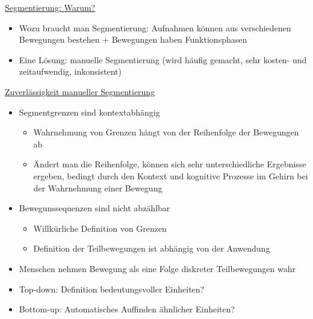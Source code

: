 \documentclass[a4paper,10pt,oneside]{article}
\begin{document}
\underline{Segmentierung: Warum?} \\
	\begin{itemize}
		\item Wozu braucht man Segmentierung: Aufnahmen können aus verschiedenen Bewegungen bestehen + Bewegungen haben Funktionsphasen
		\item Eine Lösung: manuelle Segmentierung (wird häufig gemacht, sehr kosten- und zeitaufwendig, inkonsistent)
	\end{itemize}
	
\underline{Zuverlässigkeit manueller Segmentierung} \\
	\begin{itemize}
		\item Segmentgrenzen sind kontextabhängig
			\begin{itemize}
				\item Wahrnehmung von Grenzen hängt von der Reihenfolge der Bewegungen ab
				\item Ändert man die Reihenfolge, können sich sehr unterschiedliche Ergebnisse ergeben, bedingt durch den Kontext und kognitive Prozesse im Gehirn bei der Wahrnehmung einer Bewegung
			\end{itemize}
		\item Bewegunssequenzen sind nicht abzählbar
			\begin{itemize}
				\item Willkürliche Definition von Grenzen
				\item Definition der Teilbewegungen ist abhängig von der Anwendung
			\end{itemize}
		\item Menschen nehmen Bewegung als eine Folge diskreter Teilbewegungen wahr
		\item Top-down: Definition bedeutungsvoller Einheiten?
		\item Bottom-up: Automatisches Auffinden ähnlicher Einheiten?
	\end{itemize}
 		
\underline{} \\	
 		
 		
 		
 		
 		
 		
 		
 		
 		
 		
 		
 		
 		
 		
 		
 		
 		
 		
 		
 	

 
\end{document}
